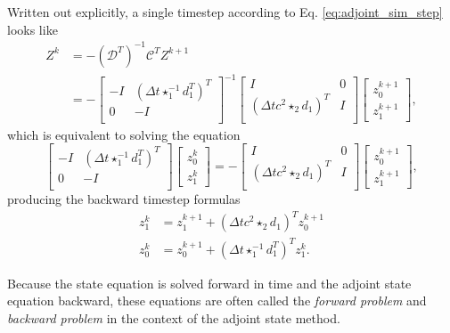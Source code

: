 \documentclass[utf8,english]{gradu3}
\begin{document}
Written out explicitly, a single timestep
according to Eq. \eqref{eq:adjoint_sim_step} looks like
\begin{align*}
  Z^k &= -(\mathcal{D}^T)^{-1} \mathcal{C}^T Z^{k+1} \\
  &= -\begin{bmatrix}
    -I & (\Delta t \star_1^{-1} d_1^T)^T \\
    0 & -I \\
  \end{bmatrix}^{-1}
  \begin{bmatrix}
    I & 0 \\
    (\Delta t c^2 \star_2 d_1)^T & I \\
  \end{bmatrix}
  \begin{bmatrix}
    z_0^{k+1} \\ z_1^{k+1}
  \end{bmatrix},
\end{align*}
which is equivalent to solving the equation
\[
  \begin{bmatrix}
    -I & (\Delta t \star_1^{-1} d_1^T)^T \\
    0 & -I \\
  \end{bmatrix}
  \begin{bmatrix}
    z_0^k \\ z_1^k
  \end{bmatrix}
  = -\begin{bmatrix}
    I & 0 \\
    (\Delta t c^2 \star_2 d_1)^T & I \\
  \end{bmatrix}
  \begin{bmatrix}
    z_0^{k+1} \\ z_1^{k+1}
  \end{bmatrix},
\]
producing the backward timestep formulas
\begin{align}
z_1^k &= z_1^{k+1} + (\Delta t c^2 \star_2 d_1)^T z_0^{k+1} \\
z_0^k &= z_0^{k+1} + (\Delta t \star_1^{-1} d_1^T)^T z_1^k.
\end{align}

Because the state equation is solved forward in time
and the adjoint state equation backward,
these equations are often called
the \textit{forward problem} and \textit{backward problem}
in the context of the adjoint state method.
\end{document}
